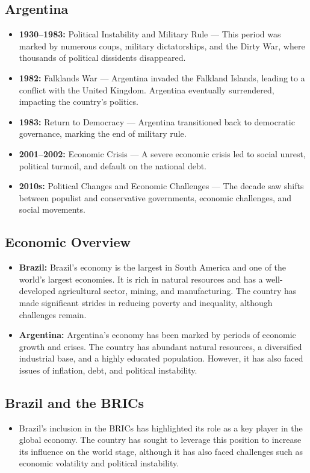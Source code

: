 \documentclass{book}
\begin{document}
\subsection{Argentina}
\label{subsec:argentina}
\begin{itemize}
    \item \textbf{1930–1983:} Political Instability and Military Rule — This period was marked by numerous coups, military dictatorships, and the Dirty War, where thousands of political dissidents disappeared.
    \item \textbf{1982:} Falklands War — Argentina invaded the Falkland Islands, leading to a conflict with the United Kingdom. Argentina eventually surrendered, impacting the country’s politics.
    \item \textbf{1983:} Return to Democracy — Argentina transitioned back to democratic governance, marking the end of military rule.
    \item \textbf{2001–2002:} Economic Crisis — A severe economic crisis led to social unrest, political turmoil, and default on the national debt.
    \item \textbf{2010s:} Political Changes and Economic Challenges — The decade saw shifts between populist and conservative governments, economic challenges, and social movements.
\end{itemize}

\subsection{Economic Overview}
\label{subsec:economic-overview}
\begin{itemize}
    \item \textbf{Brazil:} Brazil's economy is the largest in South America and one of the world's largest economies. It is rich in natural resources and has a well-developed agricultural sector, mining, and manufacturing. The country has made significant strides in reducing poverty and inequality, although challenges remain.
    \item \textbf{Argentina:} Argentina's economy has been marked by periods of economic growth and crises. The country has abundant natural resources, a diversified industrial base, and a highly educated population. However, it has also faced issues of inflation, debt, and political instability.
\end{itemize}

\subsection{Brazil and the BRICs}
\label{subsec:brazil-brics}
\begin{itemize}
    \item Brazil's inclusion in the BRICs has highlighted its role as a key player in the global economy. The country has sought to leverage this position to increase its influence on the world stage, although it has also faced challenges such as economic volatility and political instability.
\end{itemize}
\end{document}
